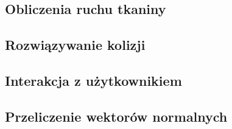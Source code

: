		\subsection{Obliczenia ruchu tkaniny}
		\label{t:praktyka:symulacja:ruch}
		
		\subsection{Rozwiązywanie kolizji}
		\label{t:praktyka:symulacja:kolizje}
		
		\subsection{Interakcja z użytkownikiem}
		\label{t:praktyka:symulacja:interakcja}
		
		\subsection{Przeliczenie wektorów normalnych}
		\label{t:praktyka:symulacja:normalne}
	
	
	
